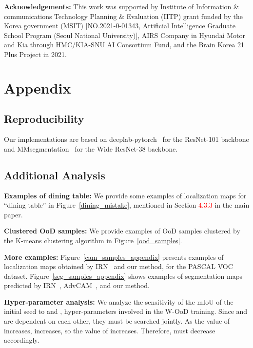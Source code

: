 \documentclass[10pt,twocolumn,letterpaper]{article}
\begin{document}
\begin{table*}[t]
\begin{minipage}{0.3\linewidth}
{\bigskip
\vspace{-0.5em}
\noindent\textbf{Acknowledgements:}
This work was supported by Institute of Information \& communications Technology Planning \& Evaluation (IITP) grant funded by the Korea government (MSIT) [NO.2021-0-01343, Artificial Intelligence Graduate School Program (Seoul National University)], 
AIRS Company in Hyundai Motor and Kia through HMC/KIA-SNU AI Consortium Fund, and the Brain Korea 21 Plus Project in 2021.


{\small


}
\setcounter{section}{0}
\renewcommand\thesection{\Alph{section}}
\setcounter{table}{0}
\renewcommand{\thetable}{A\arabic{table}}
\setcounter{figure}{0}
\renewcommand{\thefigure}{A\arabic{figure}}
\clearpage
\section{Appendix}
\subsection{Reproducibility}
Our implementations are based on deeplab-pytorch~\cite{pytorchdeeplab} for the ResNet-101 backbone and MMsegmentation~\cite{mmseg2020} for the Wide ResNet-38 backbone.


\subsection{Additional Analysis}
\textbf{Examples of dining table:} We provide some examples of localization maps for ``dining table'' in Figure~\ref{dining_mistake},  mentioned in Section \textcolor{red}{4.3.3} in the main paper.

\textbf{Clustered OoD samples:} We provide examples of OoD samples clustered by the K-means clustering algorithm in Figure~\ref{ood_samples}.

\textbf{More examples:} Figure~\ref{cam_samples_appendix} presents examples of localization maps obtained by IRN~\cite{ahn2019weakly} and our method, for the PASCAL VOC dataset.
Figure~\ref{seg_samples_appendix} shows examples of segmentation maps predicted by IRN~\cite{ahn2019weakly}, AdvCAM~\cite{lee2021anti}, and our method.


\textbf{Hyper-parameter analysis:} We analyze the sensitivity of the mIoU of the initial seed to  and , hyper-parameters involved in the W-OoD training.
Since  and  are dependent on each other, they must be searched jointly.
As the value of  increases,  increases, so the value of  increases. Therefore,  must decrease accordingly.


}
\end{minipage}
\end{table*}
\end{document}
